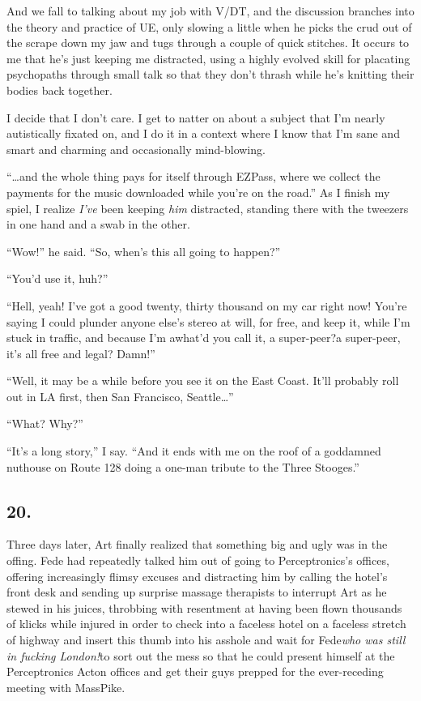 And we fall to talking about my job with V/DT, and the discussion
branches into the theory and practice of UE, only slowing a little
when he picks the crud out of the scrape down my jaw and tugs
through a couple of quick stitches. It occurs to me that he’s just
keeping me distracted, using a highly evolved skill for placating
psychopaths through small talk so that they don’t thrash while he’s
knitting their bodies back together.

I decide that I don’t care. I get to natter on about a subject that
I’m nearly autistically fixated on, and I do it in a context where
I know that I’m sane and smart and charming and occasionally
mind-blowing.

“\ldots{}and the whole thing pays for itself through EZPass, where we
collect the payments for the music downloaded while you’re on the
road.” As I finish my spiel, I realize \emph{I’ve} been keeping
\emph{him} distracted, standing there with the tweezers in one hand
and a swab in the other.

“Wow!” he said. “So, when’s this all going to happen?”

“You’d use it, huh?”

“Hell, yeah! I’ve got a good twenty, thirty thousand on my car
right now! You’re saying I could plunder anyone else’s stereo at
will, for free, and keep it, while I’m stuck in traffic, and
because I’m a{\dash}what’d you call it, a super-peer?{\dash}a super-peer, it’s
all free and legal? Damn!”

“Well, it may be a while before you see it on the East Coast. It’ll
probably roll out in LA first, then San Francisco, Seattle\ldots{}”

“What? Why?”

“It’s a long story,” I say. “And it ends with me on the roof of a
goddamned nuthouse on Route 128 doing a one-man tribute to the
Three Stooges.”

\subsection{20.}

Three days later, Art finally realized that something big and ugly
was in the offing. Fede had repeatedly talked him out of going to
Perceptronics’s offices, offering increasingly flimsy excuses and
distracting him by calling the hotel’s front desk and sending up
surprise massage therapists to interrupt Art as he stewed in his
juices, throbbing with resentment at having been flown thousands of
klicks while injured in order to check into a faceless hotel on a
faceless stretch of highway and insert this thumb into his asshole
and wait for Fede{\dash}\emph{who was still in fucking London!}{\dash}to sort
out the mess so that he could present himself at the Perceptronics
Acton offices and get their guys prepped for the ever-receding
meeting with MassPike.

